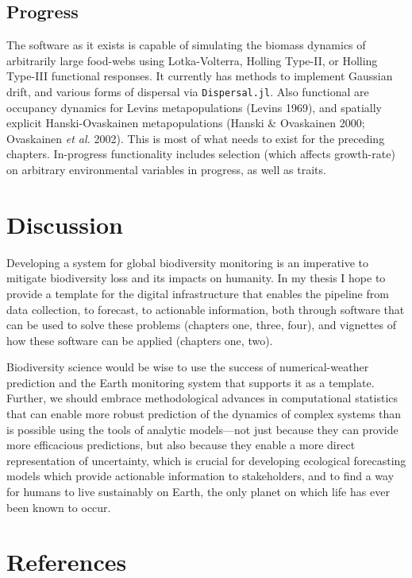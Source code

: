 \documentclass[11pt]{article}
\begin{document}
\hypertarget{progress-3}{%
\subsection{Progress}\label{progress-3}}

The software as it exists is capable of simulating the biomass dynamics
of arbitrarily large food-webs using Lotka-Volterra, Holling Type-II, or
Holling Type-III functional responses. It currently has methods to
implement Gaussian drift, and various forms of dispersal via
\texttt{Dispersal.jl}. Also functional are occupancy dynamics for Levins
metapopulations (Levins 1969), and spatially explicit Hanski-Ovaskainen
metapopulations (Hanski \& Ovaskainen 2000; Ovaskainen \emph{et al.}
2002). This is most of what needs to exist for the preceding chapters.
In-progress functionality includes selection (which affects growth-rate)
on arbitrary environmental variables in progress, as well as traits.

\hypertarget{discussion}{%
\section{Discussion}\label{discussion}}

Developing a system for global biodiversity monitoring is an imperative
to mitigate biodiversity loss and its impacts on humanity. In my thesis
I hope to provide a template for the digital infrastructure that enables
the pipeline from data collection, to forecast, to actionable
information, both through software that can be used to solve these
problems (chapters one, three, four), and vignettes of how these
software can be applied (chapters one, two).

Biodiversity science would be wise to use the success of
numerical-weather prediction and the Earth monitoring system that
supports it as a template. Further, we should embrace methodological
advances in computational statistics that can enable more robust
prediction of the dynamics of complex systems than is possible using the
tools of analytic models---not just because they can provide more
efficacious predictions, but also because they enable a more direct
representation of uncertainty, which is crucial for developing
ecological forecasting models which provide actionable information to
stakeholders, and to find a way for humans to live sustainably on Earth,
the only planet on which life has ever been known to occur.

\hypertarget{references}{%
\section*{References}\label{references}}
\end{document}
